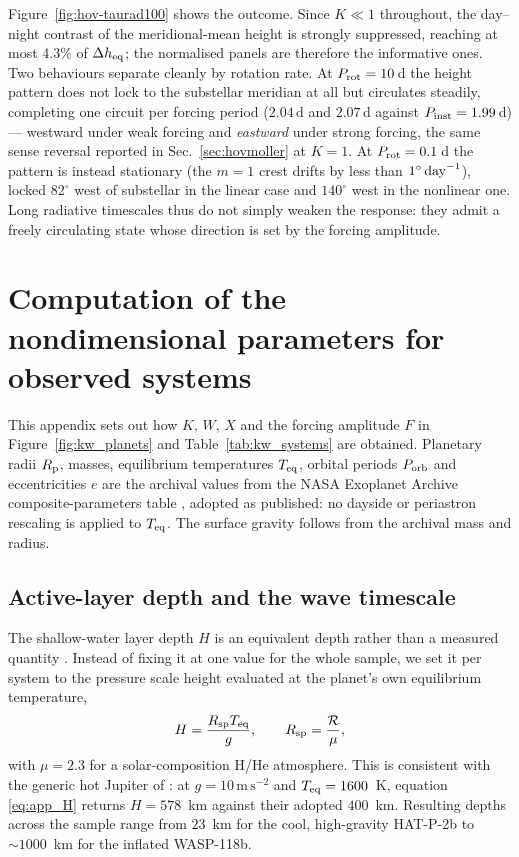 \documentclass[trackchanges,twocolumn]{aastex7}
\begin{document}
Figure~\ref{fig:hov-taurad100} shows the outcome. Since $K \ll 1$ throughout, the
day--night contrast of the meridional-mean height is strongly suppressed,
reaching at most $4.3\%$ of $\Delta h_{\rm eq}$; the normalised panels are therefore
the informative ones. Two behaviours separate cleanly by rotation rate. At
$P_{\rm rot} = 10\,$d the height pattern does not lock to the substellar meridian
at all but circulates steadily, completing one circuit per forcing period
($2.04\,$d and $2.07\,$d against $P_{\rm inst} = 1.99\,$d) --- westward under weak
forcing and \emph{eastward} under strong forcing, the same sense reversal
reported in Sec.~\ref{sec:hovmoller} at $K = 1$. At $P_{\rm rot} = 0.1\,$d the
pattern is instead stationary (the $m=1$ crest drifts by less than
$1^\circ\,{\rm day}^{-1}$), locked $82^\circ$ west of substellar in the linear case
and $140^\circ$ west in the nonlinear one. Long radiative timescales thus do not
simply weaken the response: they admit a freely circulating state whose direction
is set by the forcing amplitude.




\section{Computation of the nondimensional parameters for observed systems}
\label{app:kw_calc}

This appendix sets out how $K$, $W$, $X$ and the forcing amplitude $F$ in Figure~\ref{fig:kw_planets} and Table~\ref{tab:kw_systems} are obtained. Planetary radii $R_{\rm p}$, masses, equilibrium temperatures $T_{\rm eq}$, orbital periods $P_{\rm orb}$ and eccentricities $e$ are the archival values from the NASA Exoplanet Archive composite-parameters table \citep{NEA2026}, adopted as published: no dayside or periastron rescaling is applied to $T_{\rm eq}$. The surface gravity follows from the archival mass and radius.

\subsection{Active-layer depth and the wave timescale}

The shallow-water layer depth $H$ is an equivalent depth rather than a measured quantity \citep{vallis2017atmospheric}. Instead of fixing it at one value for the whole sample, we set it per system to the pressure scale height evaluated at the planet's own equilibrium temperature,
\begin{equation}
    H = \frac{R_{\rm sp} T_{\rm eq}}{g}, \qquad R_{\rm sp} = \frac{\mathcal{R}}{\mu},
    \label{eq:app_H}
\end{equation}
with $\mu = 2.3$ for a solar-composition H/He atmosphere. This is consistent with the generic hot Jupiter of \cite{perez2013atmospheric}: at $g = 10\,\mathrm{m\,s^{-2}}$ and $T_{\rm eq} = 1600$~K, equation \eqref{eq:app_H} returns $H = 578$~km against their adopted $400$~km. Resulting depths across the sample range from $23$~km for the cool, high-gravity HAT-P-2b to ${\sim}1000$~km for the inflated WASP-118b.
\end{document}
